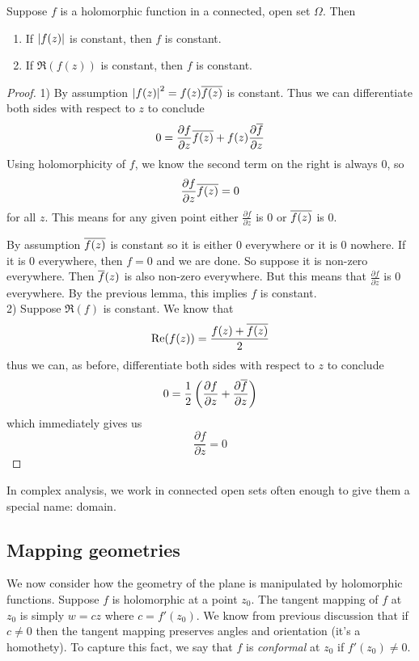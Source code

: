 \begin{proposition}
Suppose $f$ is a holomorphic function in a connected, open set $\Omega$. Then
\begin{enumerate}
    \item If $\left|f(z)\right|$ is constant, then $f$ is constant.
    \item If $\Re(f(z))$ is constant, then $f$ is constant.
\end{enumerate}
\end{proposition}
\begin{proof}
    1) By assumption $\left|f(z)\right|^2 = f(z) \overline{f(z)}$ is constant. Thus we can differentiate both sides with respect to $z$ to conclude
    $$0 = \frac{\partial f}{\partial z} \overline{f(z)} + f(z) \frac{\partial \overline{f}}{\partial z}$$
    Using holomorphicity of $f$, we know the second term on the right is always 0, so
    $$ \frac{\partial f}{\partial z} \overline{f(z)} = 0 $$
    for all $z$. This means for any given point either $\frac{\partial f}{\partial z}$ is 0 or $\overline{f(z)}$ is 0. 
    
    By assumption $\overline{f(z)}$ is constant so it is either 0 everywhere or it is 0 nowhere. If it is 0 everywhere, then $f = 0$ and we are done. So suppose it is non-zero everywhere. Then $\overline{f}(z)$ is also non-zero everywhere. But this means that $\frac{\partial f}{\partial z} $ is 0 everywhere. By the previous lemma, this implies $f$ is constant.\\
    
    2) Suppose $\Re(f)$ is constant. We know that
    $$ \text{Re}(f(z)) = \frac{f(z) + \overline{f(z)}}{2} $$
    thus we can, as before, differentiate both sides with respect to $z$ to conclude
    $$ 0 = \frac{1}{2} \left( \frac{\partial f}{\partial z} + \frac{\partial \overline{f}}{\partial z} \right) $$
    which immediately gives us
    $$ \frac{\partial f}{\partial z} = 0 $$
\end{proof}
\begin{remark}
In complex analysis, we work in connected open sets often enough to give them a special name: domain.
\end{remark}

\subsection{Mapping geometries}

We now consider how the geometry of the plane is manipulated by holomorphic functions. Suppose $f$ is holomorphic at a point $z_0$. The tangent mapping of $f$ at $z_0$ is simply $w = cz$ where $c = f'(z_0)$. We know from previous discussion that if $c \neq 0$ then the tangent mapping preserves angles and orientation (it's a homothety). To capture this fact, we say that $f$ is \textit{conformal} at $z_0$ if $f'(z_0) \neq 0$. 

